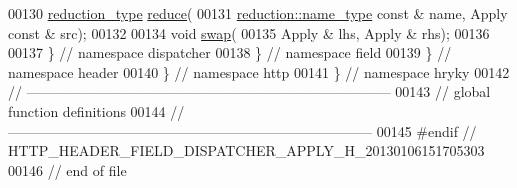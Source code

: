 \begin{DoxyCode}
00130     \hyperlink{namespacehryky_a343a9a4c36a586be5c2693156200eadc}{reduction_type} \hyperlink{namespacehryky_1_1http_a08fc36a78a8e2908140fcd102829a566}{reduce}(
00131         \hyperlink{namespacehryky_1_1reduction_ac686c30a4c8d196bbd0f05629a6b921f}{reduction::name_type} \textcolor{keyword}{const} & name, Apply \textcolor{keyword}{const} & src);
00132 
00134     \textcolor{keywordtype}{void} \hyperlink{namespacehryky_1_1http_a38e62595ad532d18fbc65ceb61973aec}{swap}(
00135         Apply & lhs, Apply & rhs);
00136 
00137 \} \textcolor{comment}{// namespace dispatcher}
00138 \} \textcolor{comment}{// namespace field}
00139 \} \textcolor{comment}{// namespace header}
00140 \} \textcolor{comment}{// namespace http}
00141 \} \textcolor{comment}{// namespace hryky}
00142 \textcolor{comment}{//
      ------------------------------------------------------------------------------}
00143 \textcolor{comment}{// global function definitions}
00144 \textcolor{comment}{//
      ------------------------------------------------------------------------------}
00145 \textcolor{preprocessor}{#endif // HTTP\_HEADER\_FIELD\_DISPATCHER\_APPLY\_H\_20130106151705303}
00146 \textcolor{preprocessor}{}\textcolor{comment}{// end of file}
\end{DoxyCode}
